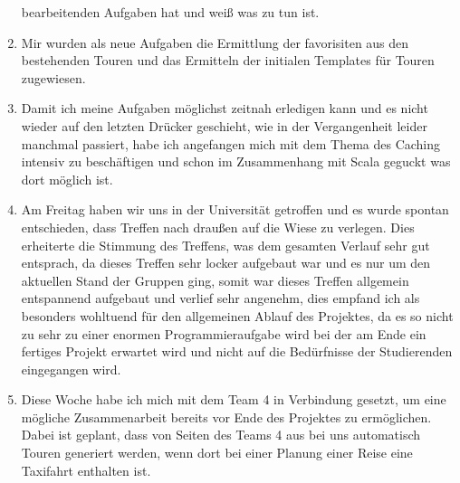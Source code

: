 \begin{enumerate}[label={\Roman*)}]
bearbeitenden Aufgaben hat und wei\ss{} was zu tun ist.
	\item Mir wurden als neue Aufgaben die Ermittlung der favorisiten aus den bestehenden Touren und das Ermitteln der
initialen Templates f\"ur Touren zugewiesen.
	\item Damit ich meine Aufgaben m\"oglichst zeitnah erledigen kann und es nicht wieder auf den letzten Dr\"ucker
geschieht, wie in der Vergangenheit leider manchmal passiert, habe ich angefangen mich mit dem Thema des Caching intensiv zu
besch\"aftigen und schon im Zusammenhang mit Scala geguckt was dort m\"oglich ist.
	\item Am Freitag haben wir uns in der Universit\"at getroffen und es wurde spontan entschieden, dass Treffen nach
drau\ss{}en auf die Wiese zu verlegen. Dies erheiterte die Stimmung des Treffens, was dem gesamten Verlauf sehr gut entsprach, da
dieses Treffen sehr locker aufgebaut war und es nur um den aktuellen Stand der Gruppen ging, somit war dieses Treffen
allgemein entspannend aufgebaut und verlief sehr angenehm, dies empfand ich als besonders wohltuend f\"ur den allgemeinen Ablauf
des Projektes, da es so nicht zu sehr zu einer enormen Programmieraufgabe wird bei der am Ende ein fertiges Projekt erwartet wird
und nicht auf die Bed\"urfnisse der Studierenden eingegangen wird.
	\item Diese Woche habe ich mich mit dem Team 4 in Verbindung gesetzt, um eine m\"ogliche Zusammenarbeit bereits vor Ende
des Projektes zu erm\"oglichen. Dabei ist geplant, dass von Seiten des Teams 4 aus bei uns automatisch Touren generiert werden,
wenn dort bei einer Planung einer Reise eine Taxifahrt enthalten ist.
\end{enumerate}